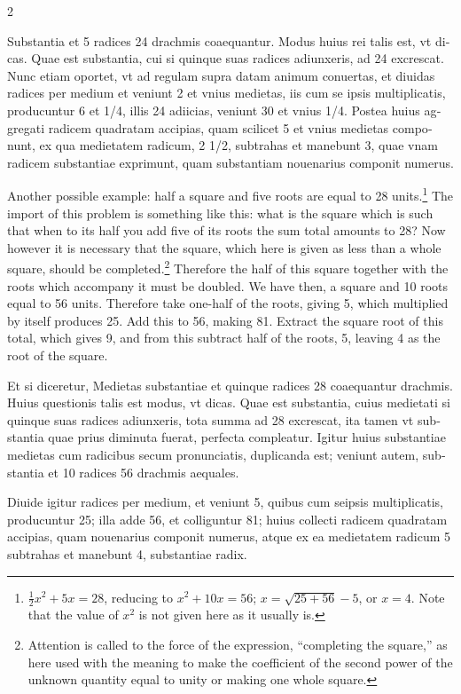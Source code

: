 \documentclass[11pt,a4paper,twoside]{book}
\newcommand{\latincolumn}[1]{\textlatin{\small #1}}
\begin{document}
\begin{paracol}{2}
\switchcolumn*

\latincolumn{Substantia et 5 radices 24 drachmis coaequantur. Modus huius rei talis est, vt dicas. Quae est substantia, cui si quinque suas radices adiunxeris, ad 24 excrescat. Nunc etiam oportet, vt ad regulam supra datam animum conuertas, et diuidas radices per medium et veniunt 2 et vnius medietas, iis cum se ipsis multiplicatis, producuntur 6 et 1/4, illis 24 adiicias, veniunt 30 et vnius 1/4. Postea huius aggregati radicem quadratam accipias, quam scilicet 5 et vnius medietas componunt, ex qua medietatem radicum, 2 1/2, subtrahas et manebunt 3, quae vnam radicem substantiae exprimunt, quam substantiam nouenarius componit numerus.}

\switchcolumn

Another possible example: half a square and five roots are equal to 28 units.\footnote{$\frac{1}{2}x^2 + 5x = 28$, reducing to $x^2 + 10x = 56$; $x = \sqrt{25 + 56} - 5$, or $x = 4$. Note that the value of $x^2$ is not given here as it usually is.} The import of this problem is something like this: what is the square which is such that when to its half you add five of its roots the sum total amounts to 28? Now however it is necessary that the square, which here is given as less than a whole square, should be completed.\footnote{Attention is called to the force of the expression, ``completing the square,'' as here used with the meaning to make the coefficient of the second power of the unknown quantity equal to unity or making one whole square.} Therefore the half of this square together with the roots which accompany it must be doubled. We have then, a square and 10 roots equal to 56 units. Therefore take one-half of the roots, giving 5, which multiplied by itself produces 25. Add this to 56, making 81. Extract the square root of this total, which gives 9, and from this subtract half of the roots, 5, leaving 4 as the root of the square.

\switchcolumn*

\latincolumn{Et si diceretur, Medietas substantiae et quinque radices 28 coaequantur drachmis. Huius questionis talis est modus, vt dicas. Quae est substantia, cuius medietati si quinque suas radices adiunxeris, tota summa ad 28 excrescat, ita tamen vt substantia quae prius diminuta fuerat, perfecta compleatur. Igitur huius substantiae medietas cum radicibus secum pronunciatis, duplicanda est; veniunt autem, substantia et 10 radices 56 drachmis aequales.}

\medskip

\latincolumn{Diuide igitur radices per medium, et veniunt 5, quibus cum seipsis multiplicatis, producuntur 25; illa adde 56, et colliguntur 81; huius collecti radicem quadratam accipias, quam nouenarius componit numerus, atque ex ea medietatem radicum 5 subtrahas et manebunt 4, substantiae radix.}


\end{paracol}
\end{document}

